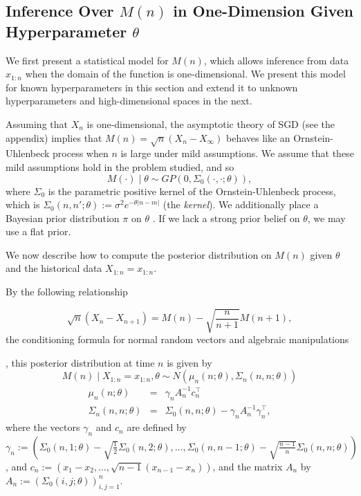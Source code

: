 \documentclass[12pt,english]{article}
\newcommand{\stedit}[1]{{\color{blue} #1}}
\begin{document}
\subsection{Inference Over $M(n)$ in One-Dimension Given Hyperparameter $\theta$}
\label{sec:SGD-GP-1}

\stedit{We first present a statistical model for $M(n)$, which allows inference from data  $x_{1:n}$ when the domain of the function is one-dimensional. We present this model for known hyperparameters in this section and extend it to unknown hyperparameters  and high-dimensional spaces in the next.}

Assuming that $X_{n}$ is one-dimensional, the asymptotic theory of SGD  (see the appendix) implies that 
$M(n)=\sqrt{n}\left(X_{n}-X_{\infty}\right)$ behaves like an Ornstein-Uhlenbeck process when $n$ is large under mild assumptions.
We assume that these mild assumptions hold in the problem studied, and so 
\[
M(\cdot) \mid \theta\sim GP\left(0,\Sigma_{0}\left(\cdot,\cdot; \theta\right)\right),
\]
where $\Sigma_{0}$ is the parametric positive kernel of the Ornstein-Uhlenbeck process, which is $\Sigma_{0}(n,n';\theta):=\sigma^{2}e^{-\theta\left|n-m\right|}$ (the {\it kernel}). 
We additionally place a Bayesian prior distribution $\pi$ on $\theta$ \citep{Neal:GPBayesian}. If we lack a strong prior belief on $\theta$, we may use a flat prior.

We now describe how to compute the posterior distribution on $M(n)$ given $\theta$ and the historical data $X_{1:n}=x_{1:n}$. \stedit{By the following relationship

\[
\sqrt{n}\left(X_{n}-X_{n+1}\right)=M\left(n\right)-\sqrt{\frac{n}{n+1}}M\left(n+1\right),
\]
the conditioning formula for normal random vectors \citep{glasserman:mc} and algebraic manipulations}, this posterior distribution at time $n$ is given by
\[
M\left(n\right)\mid X_{1:n} = x_{1:n},\theta\sim N\left(\mu_{n}\left(n;\theta\right),\Sigma_{n}\left(n,n;\theta\right)\right)
\]
\begin{eqnarray*}
\mu_{n}\left(n;\theta\right)  &=& \gamma_{n}A_{n}^{-1}c_{n}^\intercal\\
\Sigma_{n}\left(n,n;\theta\right) &=&  \Sigma_{0}\left(n,n;\theta\right)-\gamma_{n}A_{n}^{-1}\gamma_{n}^\intercal,
\end{eqnarray*}
where the vectors $\gamma_{n}$ and $c_{n}$ are defined by $\gamma_{n}:=\left(\Sigma_{0}\left(n,1;\theta\right)-\sqrt{\frac{1}{2}}\Sigma_{0}\left(n,2;\theta\right),\ldots,\Sigma_{0}\left(n,n-1;\theta\right)-\sqrt{\frac{n-1}{n}}\Sigma_{0}\left(n,n;\theta\right)\right)$, and
$c_{n}:=\left(x_{1}-x_{2},\ldots,\sqrt{n-1}\left(x_{n-1}-x_{n}\right)\right)$,
and the matrix $A_{n}$ by $A_{n}:=(\Sigma_{0}\left(i,j;\theta\right))_{i,j=1}^{n}$.
\end{document}
